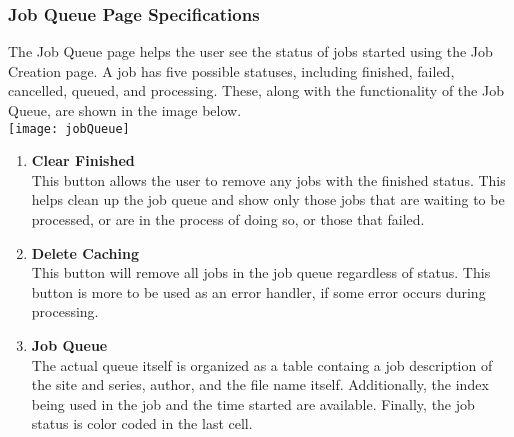 \subsubsection{Job Queue Page Specifications}
The Job Queue page helps the user see the status of jobs started using the Job Creation page. A job has five possible statuses, including finished, failed, cancelled, queued, and processing. These, along with the functionality of the Job Queue, are shown in the image below.\\
\texttt{[image: jobQueue]}
\begin{enumerate}
  \item \textbf{Clear Finished}\\ This button allows the user to remove any jobs with the finished status. This helps clean up the job queue and show only those jobs that are waiting to be processed, or are in the process of doing so, or those that failed.
  \item \textbf{Delete Caching}\\ This button will remove all jobs in the job queue regardless of status. This button is more to be used as an error handler, if some error occurs during processing.
  \item \textbf{Job Queue}\\ The actual queue itself is organized as a table containg a job description of the site and series, author, and the file name itself. Additionally, the index being used in the job and the time started are available. Finally, the job status is color coded in the last cell.
\end{enumerate}
